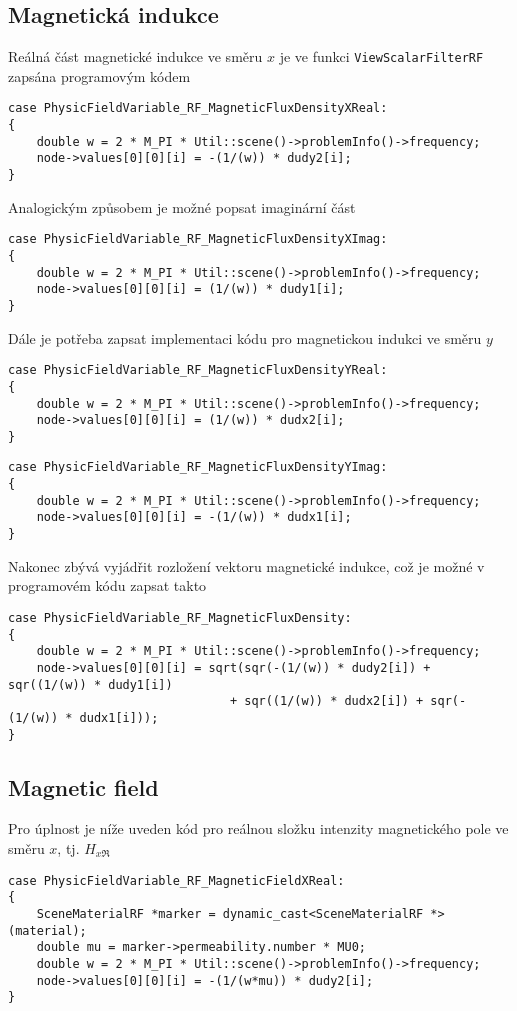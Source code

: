 \subsection*{Magnetická indukce}
Reálná část magnetické indukce ve směru $x$ je ve funkci \texttt{ViewScalarFilterRF} zapsána programovým kódem
\begin{verbatim}
case PhysicFieldVariable_RF_MagneticFluxDensityXReal:
{
    double w = 2 * M_PI * Util::scene()->problemInfo()->frequency;
    node->values[0][0][i] = -(1/(w)) * dudy2[i];
}
\end{verbatim}
Analogickým způsobem je možné popsat imaginární část
\begin{verbatim}
case PhysicFieldVariable_RF_MagneticFluxDensityXImag:
{
    double w = 2 * M_PI * Util::scene()->problemInfo()->frequency;
    node->values[0][0][i] = (1/(w)) * dudy1[i];
}    
\end{verbatim}
Dále je potřeba zapsat implementaci kódu pro magnetickou indukci ve směru $y$
\begin{verbatim}
case PhysicFieldVariable_RF_MagneticFluxDensityYReal:
{
    double w = 2 * M_PI * Util::scene()->problemInfo()->frequency;
    node->values[0][0][i] = (1/(w)) * dudx2[i];
}
\end{verbatim}
\begin{verbatim}
case PhysicFieldVariable_RF_MagneticFluxDensityYImag:
{
    double w = 2 * M_PI * Util::scene()->problemInfo()->frequency;
    node->values[0][0][i] = -(1/(w)) * dudx1[i];
}
\end{verbatim}
Nakonec zbývá vyjádřit rozložení vektoru magnetické indukce, což je možné v programovém kódu zapsat takto
\begin{verbatim}
case PhysicFieldVariable_RF_MagneticFluxDensity:
{
    double w = 2 * M_PI * Util::scene()->problemInfo()->frequency;
    node->values[0][0][i] = sqrt(sqr(-(1/(w)) * dudy2[i]) + sqr((1/(w)) * dudy1[i])
                               + sqr((1/(w)) * dudx2[i]) + sqr(-(1/(w)) * dudx1[i]));
}
\end{verbatim}

\subsection*{Magnetic field}
Pro úplnost je níže uveden kód pro reálnou složku intenzity magnetického pole ve směru $x$, tj. $H_{x\Re}$
\begin{verbatim}
case PhysicFieldVariable_RF_MagneticFieldXReal:
{
    SceneMaterialRF *marker = dynamic_cast<SceneMaterialRF *>(material);
    double mu = marker->permeability.number * MU0;
    double w = 2 * M_PI * Util::scene()->problemInfo()->frequency;
    node->values[0][0][i] = -(1/(w*mu)) * dudy2[i];
}
\end{verbatim}

